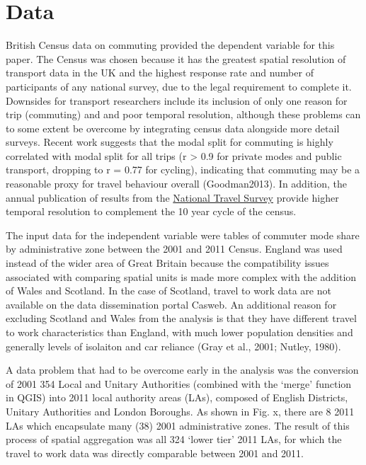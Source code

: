 \section{Data}\label{data}

British Census data on commuting provided the dependent variable for
this paper. The Census was chosen because it has the greatest spatial
resolution of transport data in the UK and the highest response rate and
number of participants of any national survey, due to the legal
requirement to complete it. Downsides for transport researchers include
its inclusion of only one reason for trip (commuting) and and poor
temporal resolution, although these problems can to some extent be
overcome by integrating census data alongside more detail surveys.
Recent work suggests that the modal split for commuting is highly
correlated with modal split for all trips (r \textgreater{} 0.9 for
private modes and public transport, dropping to r = 0.77 for cycling),
indicating that commuting may be a reasonable proxy for travel behaviour
overall (Goodman2013). In addition, the annual publication of results
from the
\href{https://www.gov.uk/government/collections/national-travel-survey-statistics}{National
Travel Survey} provide higher temporal resolution to complement the 10
year cycle of the census.

The input data for the independent variable were tables of commuter mode
share by administrative zone between the 2001 and 2011 Census. England
was used instead of the wider area of Great Britain because the
compatibility issues associated with comparing spatial units is made
more complex with the addition of Wales and Scotland. In the case of
Scotland, travel to work data are not available on the data
dissemination portal Casweb. An additional reason for excluding Scotland
and Wales from the analysis is that they have different travel to work
characteristics than England, with much lower population densities and
generally levels of isolaiton and car reliance (Gray et al., 2001;
Nutley, 1980).

A data problem that had to be overcome early in the analysis was the
conversion of 2001 354 Local and Unitary Authorities (combined with the
`merge' function in QGIS) into 2011 local authority areas (LAs),
composed of English Districts, Unitary Authorities and London Boroughs.
As shown in Fig. x, there are 8 2011 LAs which encapsulate many (38)
2001 administrative zones. The result of this process of spatial
aggregation was all 324 `lower tier' 2011 LAs, for which the travel to
work data was directly comparable between 2001 and 2011.

